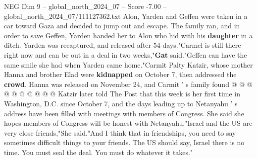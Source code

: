\begin{textsample}{NEG Dim 9 – global\_north\_2024\_07 – Score -7.00 – global\_north\_2024\_07/111127362.txt}
Alon, Yarden and Geffen were taken in a car toward Gaza and decided to jump out and escape.
The family ran, and in order to save Geffen, Yarden handed her to Alon who hid with his \textbf{daughter} in a ditch.
Yarden was recaptured, and released after 54 days."Carmel is still there right now and can be out in a deal in two weeks,"\textbf{Gat} said."Geffen can have the same smile she had when Yarden came home."Carmit Palty Katzir, whose mother Hanna and brother Elad were \textbf{kidnapped} on October 7, then addressed the \textbf{crowd}.
Hanna was released on November 24, and Carmit ' s family found @ @ @ @ @ @ @ @ @ @ Katzir later told The Post that this week is her first time in Washington, D.C. since October 7, and the days leading up to Netanyahu ' s address have been filled with meetings with members of Congress.
She said she hopes members of Congress will be honest with Netanyahu."Israel and the US are very close friends,"She said."And I think that in friendships, you need to say sometimes difficult things to your friends.
The US should say, Israel there is no time.
You must seal the deal.
You must do whatever it takes."

\end{textsample}
